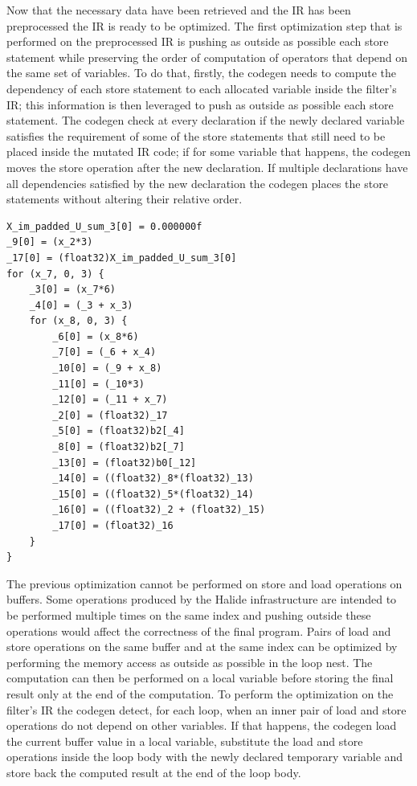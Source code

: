 \documentclass[../main.tex]{subfiles}
\begin{document}
Now that the necessary data have been retrieved and the IR has been preprocessed the IR is ready to be optimized.
The first optimization step that is performed on the preprocessed IR is pushing as outside as possible each store statement while preserving the order of computation of operators that depend on the same set of variables.
To do that, firstly, the codegen needs to compute the dependency of each store statement to each allocated variable inside the filter's IR; this information is then leveraged to push as outside as possible each store statement.
The codegen check at every declaration if the newly declared variable satisfies the requirement of some of the store statements that still need to be placed inside the mutated IR code; if for some variable that happens, the codegen moves the store operation after the new declaration.
If multiple declarations have all dependencies satisfied by the new declaration the codegen places the store statements without altering their relative order.

\begin{lstlisting}[caption = Example of optimized IR. The complex operation of the previous example has been split into simple operations. Intermediate results that are shared among different iterations and memory accesses has been pushed outside]
X_im_padded_U_sum_3[0] = 0.000000f
_9[0] = (x_2*3)
_17[0] = (float32)X_im_padded_U_sum_3[0]
for (x_7, 0, 3) {
    _3[0] = (x_7*6)
    _4[0] = (_3 + x_3)
    for (x_8, 0, 3) {
        _6[0] = (x_8*6)
        _7[0] = (_6 + x_4)
        _10[0] = (_9 + x_8)
        _11[0] = (_10*3)
        _12[0] = (_11 + x_7)
        _2[0] = (float32)_17
        _5[0] = (float32)b2[_4]
        _8[0] = (float32)b2[_7]
        _13[0] = (float32)b0[_12]
        _14[0] = ((float32)_8*(float32)_13)
        _15[0] = ((float32)_5*(float32)_14)
        _16[0] = ((float32)_2 + (float32)_15)
        _17[0] = (float32)_16
    }
}
\end{lstlisting}

The previous optimization cannot be performed on store and load operations on buffers.
Some operations produced by the Halide infrastructure are intended to be performed multiple times on the same index and pushing outside these operations would affect the correctness of the final program.
Pairs of load and store operations on the same buffer and at the same index can be optimized by performing the memory access as outside as possible in the loop nest.
The computation can then be performed on a local variable before storing the final result only at the end of the computation.
To perform the optimization on the filter's IR the codegen detect, for each loop, when an inner pair of load and store operations do not depend on other variables.
If that happens, the codegen load the current buffer value in a local variable, substitute the load and store operations inside the loop body with the newly declared temporary variable and store back the computed result at the end of the loop body.
\end{document}
